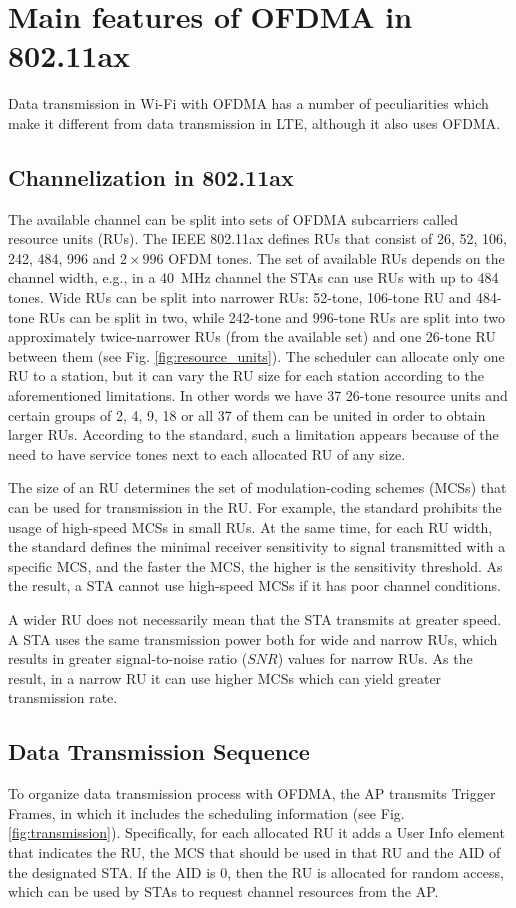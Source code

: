 \section{Main features of OFDMA in 802.11ax}
Data transmission in Wi-Fi with OFDMA has a number of peculiarities which make it different from data transmission in LTE, although it also uses OFDMA.

\subsection{Channelization in 802.11ax}
The available channel can be split into sets of OFDMA subcarriers called resource units (RUs).
The IEEE 802.11ax defines RUs that consist of 26, 52, 106, 242, 484, 996 and $2\times996$ OFDM tones.
The set of available RUs depends on the channel width, e.g., in a \SI{40}{\MHz} channel the STAs can use RUs with up to 484 tones.
Wide RUs can be split into narrower RUs: 52-tone, 106-tone RU and 484-tone RUs can be split in two, while 242-tone and 996-tone RUs are split into two approximately twice-narrower RUs (from the available set) and one 26-tone RU between them (see Fig. \ref{fig:resource_units}).
The scheduler can allocate only one RU to a station, but it can vary the RU size for each station according to the aforementioned limitations.
In other words we have 37 26-tone resource units and certain groups of 2, 4, 9, 18 or all 37 of them can be united in order to obtain larger RUs.
According to the standard, such a limitation appears because of the need to have service tones next to each allocated RU of any size.

The size of an RU determines the set of modulation-coding schemes (MCSs) that can be used for transmission in the RU.
For example, the standard prohibits the usage of high-speed MCSs in small RUs.
At the same time, for each RU width, the standard defines the minimal receiver sensitivity to signal transmitted with a specific MCS, and the faster the MCS, the higher is the sensitivity threshold.
As the result, a STA cannot use high-speed MCSs if it has poor channel conditions.

A wider RU does not necessarily mean that the STA transmits at greater speed.
A STA uses the same transmission power both for wide and narrow RUs, which results in greater signal-to-noise ratio ($SNR$) values for narrow RUs.
As the result, in a narrow RU it can use higher MCSs which can yield greater transmission rate.

\subsection{Data Transmission Sequence}
To organize data transmission process with OFDMA, the AP transmits Trigger Frames, in which it includes the scheduling information (see Fig. \ref{fig:transmission}).
Specifically, for each allocated RU it adds a User Info element that indicates the RU, the MCS that should be used in that RU and the AID of the designated STA.
If the AID is $0$, then the RU is allocated for random access, which can be used by STAs to request channel resources from the AP.

